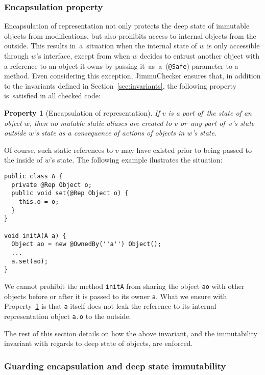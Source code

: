\documentclass{pracamgr}
\theoremstyle{break}
\theoremstyle{break}
\newtheorem{invariant}{Property}
\theoremstyle{break}
\begin{document}
\subsubsection{Encapsulation property} 

Encapsulation of representation not only protects the deep state of
immutable objects from modifications, but also prohibits access to
internal objects from the outside. This results in~a~situation when
the internal state of $w$ is only accessible through $w$'s interface,
except from when $w$ decides to entrust another object with a
reference to an object it owns by passing it~as~a~(\texttt{@Safe})
parameter to a method. Even considering this exception, JimmuChecker
ensures that, in addition to the invariants defined in
Section~\ref{sec:invariants}, the following property is~satisfied in
all checked code:

\begin{invariant}[Encapsulation of representation] \label{inv:encap}
  If $v$ is a part of~the state of an object $w$, then no mutable
  static aliases are created to $v$ or~any part of~$v$'s state outside
  $w$'s state as a consequence of actions of objects in $w$'s state.
\end{invariant}

Of course, such static references to $v$ may have existed prior to
being passed to the inside of $w$'s state. The following example
ilustrates the situation:

\begin{lstlisting}
public class A {
  private @Rep Object o;
  public void set(@Rep Object o) {
    this.o = o;
  }
}

void initA(A a) {
  Object ao = new @OwnedBy(''a'') Object();
  ...
  a.set(ao);
}
\end{lstlisting}

We cannot prohibit the method \texttt{initA} from sharing the object
\texttt{ao} with other objects before or after it is passed to its
owner \texttt{a}. What we ensure with Property~\ref{inv:encap} is that
\texttt{a} itself does not leak the reference to its internal
representation object \texttt{a.o} to the outside.

The rest of this section details on how the above invariant, and the
immutability invariant with regards to deep state of objects, are
enforced.

\subsubsection{Guarding encapsulation and deep state immutability} 
\end{document}
